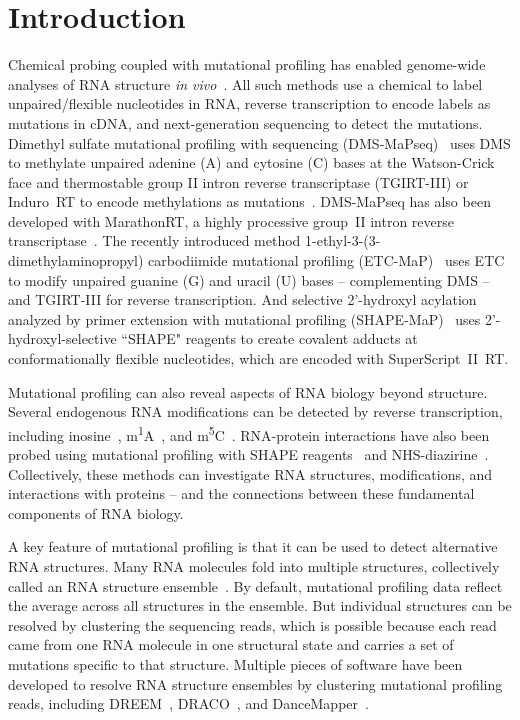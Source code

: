 \documentclass[unnumsec,webpdf,contemporary,large]{oup-authoring-template}%
\theoremstyle{thmstyleone}%
\theoremstyle{thmstyletwo}%
\theoremstyle{thmstylethree}%
\begin{document}
\maketitle


\section{Introduction}

Chemical probing coupled with mutational profiling has enabled genome-wide analyses of RNA structure \textit{in vivo}~\cite{Spitale2023}.
All such methods use a chemical to label unpaired/flexible nucleotides in RNA, reverse transcription to encode labels as mutations in cDNA, and next-generation sequencing to detect the mutations.
Dimethyl sulfate mutational profiling with sequencing (DMS-MaPseq)~\cite{Zubradt2016} uses DMS to methylate unpaired adenine (A) and cytosine (C) bases at the Watson-Crick face and thermostable group II intron reverse transcriptase (TGIRT-III) or Induro~RT to encode methylations as mutations~\cite{RomeroAgosto2024}. DMS-MaPseq has also been developed with MarathonRT, a highly processive group~II intron reverse transcriptase~\cite{Guo2020,Saleem2025}.
The recently introduced method 1-ethyl-3-(3-dimethylaminopropyl) carbodiimide mutational profiling (ETC-MaP)~\cite{Douds2024} uses ETC to modify unpaired guanine (G) and uracil (U) bases -- complementing DMS -- and TGIRT-III for reverse transcription.
And selective 2'-hydroxyl acylation analyzed by primer extension with mutational profiling (SHAPE-MaP)~\cite{Siegfried2014} uses 2'-hydroxyl-selective ``SHAPE" reagents to create covalent adducts at conformationally flexible nucleotides, which are encoded with SuperScript~II~RT.

Mutational profiling can also reveal aspects of RNA biology beyond structure.
Several endogenous RNA modifications can be detected by reverse transcription, including inosine~\cite{Okada2019}, m\textsuperscript{1}A~\cite{Li2017}, and m\textsuperscript{5}C~\cite{Schaefer2008}.
RNA-protein interactions have also been probed using mutational profiling with SHAPE reagents~\cite{Smola2015} and NHS-diazirine~\cite{Weidmann2021}.
Collectively, these methods can investigate RNA structures, modifications, and interactions with proteins -- and the connections between these fundamental components of RNA biology.

A key feature of mutational profiling is that it can be used to detect alternative RNA structures.
Many RNA molecules fold into multiple structures, collectively called an RNA structure ensemble~\cite{Spitale2023}.
By default, mutational profiling data reflect the average across all structures in the ensemble.
But individual structures can be resolved by clustering the sequencing reads, which is possible because each read came from one RNA molecule in one structural state and carries a set of mutations specific to that structure.
Multiple pieces of software have been developed to resolve RNA structure ensembles by clustering mutational profiling reads, including DREEM~\cite{Tomezsko2020}, DRACO~\cite{Morandi2021}, and DanceMapper~\cite{Olson2022}.
\end{document}
